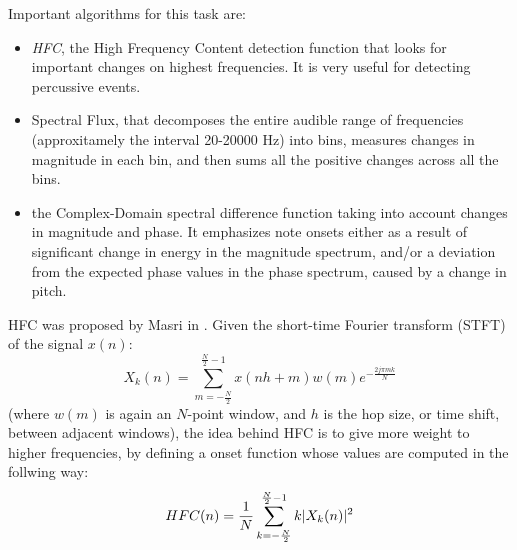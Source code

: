 Important algorithms for this task are:
\begin{itemize}
\item \textit{HFC}, the High Frequency Content detection function that looks for important changes on highest frequencies. It is very useful for detecting percussive events.
\item Spectral Flux, that decomposes the entire audible range of frequencies (approxitamely the interval 20-20000 Hz) into bins, measures changes in magnitude in each bin, and then sums all the positive changes across all the bins.
\item the Complex-Domain spectral difference function \cite{bello04} taking into account changes in magnitude and phase. It emphasizes note onsets either as a result of significant change in energy in the magnitude spectrum, and/or a deviation from the expected phase values in the phase spectrum, caused by a change in pitch.
\end{itemize}  
HFC was proposed by Masri in \cite{masri96}. Given the short-time Fourier transform (STFT) of the signal $x(n)$:\\
\begin{equation}
X_k(n) = \sum\limits_{m=-\frac{N}{2}}^{\frac{N}{2}-1} x(nh + m)w(m)e^{-\frac{2j\pi mk}{N}}
\end{equation}
(where $w(m)$ is again an $N$-point window, and $h$ is the hop size, or time shift, between adjacent windows), the idea behind HFC is to give more weight to higher frequencies, by defining a onset function whose values are computed in the follwing way:
\begin{equation}
HFC(n) = \frac{1}{N}\sum\limits_{k=-\frac{N}{2}}^{\frac{N}{2}-1} k\lvert X_k(n)\rvert^{2}
\end{equation}

